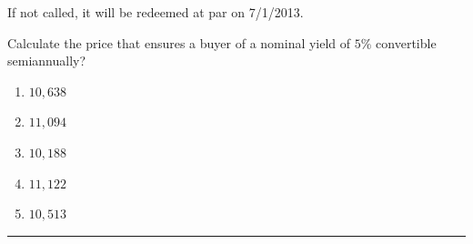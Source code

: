 \documentclass[11pt]{article}
\begin{document}
If not called, it will be redeemed at par on 7/1/2013.

Calculate the price that ensures a buyer of a nominal yield of \(5\%\) convertible semiannually?

\begin{enumerate}[label=\Alph*.]
    \item \(10{,}638\)
    \item \(11{,}094\)
    \item \(10{,}188\)
    \item \(11{,}122\)
    \item \(10{,}513\)
\end{enumerate}

\medskip
\hrule
\end{document}

